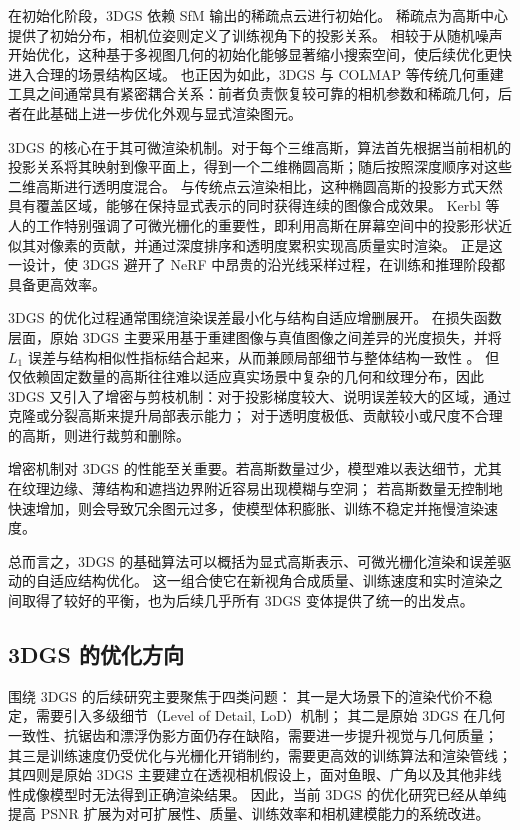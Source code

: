 在初始化阶段，3DGS 依赖 SfM 输出的稀疏点云进行初始化。
稀疏点为高斯中心提供了初始分布，相机位姿则定义了训练视角下的投影关系。
相较于从随机噪声开始优化，这种基于多视图几何的初始化能够显著缩小搜索空间，使后续优化更快进入合理的场景结构区域。
也正因为如此，3DGS 与 COLMAP 等传统几何重建工具之间通常具有紧密耦合关系：前者负责恢复较可靠的相机参数和稀疏几何，后者在此基础上进一步优化外观与显式渲染图元。

3DGS 的核心在于其可微渲染机制。对于每个三维高斯，算法首先根据当前相机的投影关系将其映射到像平面上，得到一个二维椭圆高斯；随后按照深度顺序对这些二维高斯进行透明度混合。
与传统点云渲染相比，这种椭圆高斯的投影方式天然具有覆盖区域，能够在保持显式表示的同时获得连续的图像合成效果。
Kerbl 等人的工作特别强调了可微光栅化的重要性，即利用高斯在屏幕空间中的投影形状近似其对像素的贡献，并通过深度排序和透明度累积实现高质量实时渲染。
正是这一设计，使 3DGS 避开了 NeRF 中昂贵的沿光线采样过程，在训练和推理阶段都具备更高效率。

3DGS 的优化过程通常围绕渲染误差最小化与结构自适应增删展开。
在损失函数层面，原始 3DGS 主要采用基于重建图像与真值图像之间差异的光度损失，并将 \(L_1\) 误差与结构相似性指标结合起来，从而兼顾局部细节与整体结构一致性 \cite{kerbl2023}。
但仅依赖固定数量的高斯往往难以适应真实场景中复杂的几何和纹理分布，因此 3DGS 又引入了增密与剪枝机制：对于投影梯度较大、说明误差较大的区域，通过克隆或分裂高斯来提升局部表示能力；
对于透明度极低、贡献较小或尺度不合理的高斯，则进行裁剪和删除。

增密机制对 3DGS 的性能至关重要。若高斯数量过少，模型难以表达细节，尤其在纹理边缘、薄结构和遮挡边界附近容易出现模糊与空洞；
若高斯数量无控制地快速增加，则会导致冗余图元过多，使模型体积膨胀、训练不稳定并拖慢渲染速度。

总而言之，3DGS 的基础算法可以概括为显式高斯表示、可微光栅化渲染和误差驱动的自适应结构优化。
这一组合使它在新视角合成质量、训练速度和实时渲染之间取得了较好的平衡，也为后续几乎所有 3DGS 变体提供了统一的出发点。

\subsection{3DGS 的优化方向}

围绕 3DGS 的后续研究主要聚焦于四类问题：
其一是大场景下的渲染代价不稳定，需要引入多级细节（Level of Detail, LoD）机制；
其二是原始 3DGS 在几何一致性、抗锯齿和漂浮伪影方面仍存在缺陷，需要进一步提升视觉与几何质量；
其三是训练速度仍受优化与光栅化开销制约，需要更高效的训练算法和渲染管线；
其四则是原始 3DGS 主要建立在透视相机假设上，面对鱼眼、广角以及其他非线性成像模型时无法得到正确渲染结果。
因此，当前 3DGS 的优化研究已经从单纯提高 PSNR 扩展为对可扩展性、质量、训练效率和相机建模能力的系统改进。

